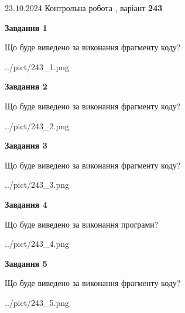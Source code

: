 \documentclass[12pt, ukrainian]{article}
\begin{document}
{\Large{23.10.2024 Контрольна робота , варіант  \No \textbf { 243 }\par}}
{
\begin {large}
{\begin {center}\textbf{Завдання 1}\end {center}}

Що буде виведено за виконання фрагменту коду?\par
\begin{center}
	{../pict/243_1.png}
\end{center}
\newpage

{\begin {center}\textbf{Завдання 2}\end {center}}

Що буде виведено за виконання фрагменту коду?\par
\begin{center}
	{../pict/243_2.png}
\end{center}
\newpage

{\begin {center}\textbf{Завдання 3}\end {center}}

Що буде виведено за виконання фрагменту коду?\par
\begin{center}
	{../pict/243_3.png}
\end{center}
\newpage

{\begin {center}\textbf{Завдання 4}\end {center}}

Що буде виведено за виконання програми?\par
\begin{center}
	{../pict/243_4.png}
\end{center}
\newpage

{\begin {center}\textbf{Завдання 5}\end {center}}

Що буде виведено за виконання фрагменту коду?\par
\begin{center}
	{../pict/243_5.png}
\end{center}
\newpage


\end{large}}
\end{document}

